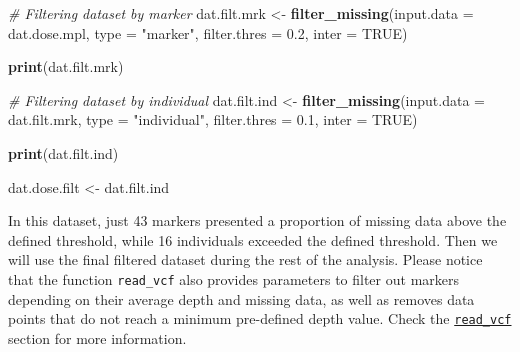 \documentclass[
]{article}
\newenvironment{Shaded}{}{}
\newcommand{\CommentTok}[1]{\textcolor[rgb]{0.38,0.63,0.69}{\textit{#1}}}
\newcommand{\DataTypeTok}[1]{\textcolor[rgb]{0.56,0.13,0.00}{#1}}
\newcommand{\FloatTok}[1]{\textcolor[rgb]{0.25,0.63,0.44}{#1}}
\newcommand{\KeywordTok}[1]{\textcolor[rgb]{0.00,0.44,0.13}{\textbf{#1}}}
\newcommand{\NormalTok}[1]{#1}
\newcommand{\OtherTok}[1]{\textcolor[rgb]{0.00,0.44,0.13}{#1}}
\newcommand{\StringTok}[1]{\textcolor[rgb]{0.25,0.44,0.63}{#1}}
\begin{document}
\begin{Shaded}
\begin{Highlighting}[]
\CommentTok{# Filtering dataset by marker}
\NormalTok{dat.filt.mrk <-}\StringTok{ }\KeywordTok{filter_missing}\NormalTok{(}\DataTypeTok{input.data =}\NormalTok{ dat.dose.mpl, }\DataTypeTok{type =} \StringTok{"marker"}\NormalTok{, }
                               \DataTypeTok{filter.thres =} \FloatTok{0.2}\NormalTok{, }\DataTypeTok{inter =} \OtherTok{TRUE}\NormalTok{)}
\end{Highlighting}
\end{Shaded}

\begin{Shaded}
\begin{Highlighting}[]
\KeywordTok{print}\NormalTok{(dat.filt.mrk)}
\end{Highlighting}
\end{Shaded}

\begin{Shaded}
\begin{Highlighting}[]
\CommentTok{# Filtering dataset by individual}
\NormalTok{dat.filt.ind <-}\StringTok{ }\KeywordTok{filter_missing}\NormalTok{(}\DataTypeTok{input.data =}\NormalTok{ dat.filt.mrk, }\DataTypeTok{type =} \StringTok{"individual"}\NormalTok{, }
                               \DataTypeTok{filter.thres =} \FloatTok{0.1}\NormalTok{, }\DataTypeTok{inter =} \OtherTok{TRUE}\NormalTok{)                            }
\end{Highlighting}
\end{Shaded}

\begin{Shaded}
\begin{Highlighting}[]
\KeywordTok{print}\NormalTok{(dat.filt.ind)}
\end{Highlighting}
\end{Shaded}

\begin{Shaded}
\begin{Highlighting}[]
\NormalTok{dat.dose.filt <-}\StringTok{ }\NormalTok{dat.filt.ind}
\end{Highlighting}
\end{Shaded}

In this dataset, just 43 markers presented a proportion of missing data
above the defined threshold, while 16 individuals exceeded the defined
threshold. Then we will use the final filtered dataset during the rest
of the analysis. Please notice that the function \texttt{read\_vcf} also
provides parameters to filter out markers depending on their average
depth and missing data, as well as removes data points that do not reach
a minimum pre-defined depth value. Check the
\protect\hyperlink{read_vcf}{\texttt{read\_vcf}} section for more
information.
\end{document}
